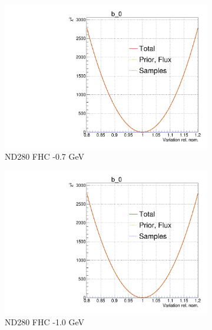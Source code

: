 \begin{figure}[!h]
	\centering
\begin{subfigure}[t]{0.32\textwidth}
	\includegraphics[width=\textwidth, trim={0mm 0mm 0mm 11mm}, clip,page=5]{figures/mach3/Asimov/Full_LLHscan_18July_BeRPA_U_ND280logL_scan}
	\caption{ND280 FHC -0.7 GeV}
\end{subfigure}
\begin{subfigure}[t]{0.32\textwidth}
\includegraphics[width=\textwidth, trim={0mm 0mm 0mm 11mm}, clip,page=13]{figures/mach3/Asimov/Full_LLHscan_18July_BeRPA_U_ND280logL_scan}
	\caption{ND280 FHC -1.0 GeV}
\end{subfigure}
\begin{subfigure}[t]{0.32\textwidth}

\end{subfigure}
\end{figure}
